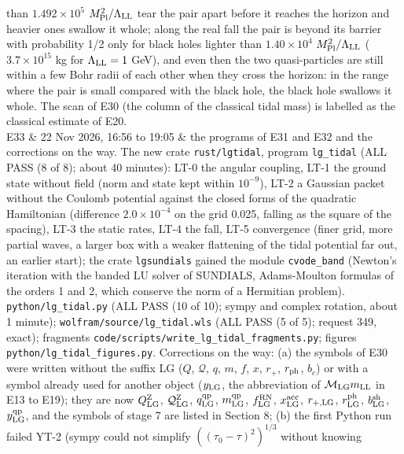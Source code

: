 \documentclass[
  10pt,
]{article}
\begin{document}
\begin{longtable}[]
than \(1.492\times10^{5}\) \(M_{\rm Pl}^2/\Lambda_{\rm LL}\) tear the
pair apart before it reaches the horizon and heavier ones swallow it
whole; along the real fall the pair is beyond its barrier with
probability 1/2 only for black holes lighter than \(1.40\times10^{4}\)
\(M_{\rm Pl}^2/\Lambda_{\rm LL}\) (\(3.7\times10^{15}\) kg for
\(\Lambda_{\rm LL}=1\) GeV), and even then the two quasi-particles are
still within a few Bohr radii of each other when they cross the horizon:
in the range where the pair is small compared with the black hole, the
black hole swallows it whole. The scan of E30 (the column of the
classical tidal mass) is labelled as the classical estimate of E20. \\
E33 & 22 Nov 2026, 16:56 to 19:05 & the programs of E31 and E32 and the
corrections on the way. The new crate \texttt{rust/lgtidal}, program
\texttt{lg\_tidal} (ALL PASS (8 of 8); about 40 minutes): LT-0 the
angular coupling, LT-1 the ground state without field (norm and state
kept within \(10^{-9}\)), LT-2 a Gaussian packet without the Coulomb
potential against the closed forms of the quadratic Hamiltonian
(difference \(2.0\times10^{-4}\) on the grid 0.025, falling as the
square of the spacing), LT-3 the static rates, LT-4 the fall, LT-5
convergence (finer grid, more partial waves, a larger box with a weaker
flattening of the tidal potential far out, an earlier start); the crate
\texttt{lgsundials} gained the module \texttt{cvode\_band} (Newton's
iteration with the banded LU solver of SUNDIALS, Adams-Moulton formulas
of the orders 1 and 2, which conserve the norm of a Hermitian problem).
\texttt{python/lg\_tidal.py} (ALL PASS (10 of 10); sympy and complex
rotation, about 1 minute); \texttt{wolfram/source/lg\_tidal.wls} (ALL
PASS (5 of 5); request 349, exact); fragments
\texttt{code/scripts/write\_lg\_tidal\_fragments.py}; figures
\texttt{python/lg\_tidal\_figures.py}. Corrections on the way: (a) the
symbols of E30 were written without the suffix LG (\(Q\),
\(\mathcal Q\), \(q\), \(m\), \(f\), \(x\), \(r_+\), \(r_{\rm ph}\),
\(b_c\)) or with a symbol already used for another object
(\(y_{\rm LG}\), the abbreviation of \(\mathcal M_{\rm LG}m_{\rm LL}\)
in E13 to E19); they are now \(Q^{\rm Z}_{\rm LG}\),
\(\mathcal Q^{\rm Z}_{\rm LG}\), \(q^{\rm qp}_{\rm LG}\),
\(m^{\rm qp}_{\rm LG}\), \(f^{\rm RN}_{\rm LG}\),
\(x^{\rm acc}_{\rm LG}\), \(r_{+,\rm LG}\), \(r^{\rm ph}_{\rm LG}\),
\(b^{\rm sh}_{\rm LG}\), \(y^{\rm qp}_{\rm LG}\), and the symbols of
stage 7 are listed in Section 8; (b) the first Python run failed YT-2
(sympy could not simplify \(((\tau_0-\tau)^2)^{1/3}\) without knowing

\end{longtable}
\end{document}
